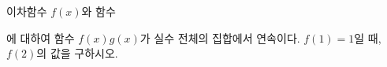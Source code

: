 이차함수 $f(x)$와 함수 \par\smallskip{}\par\smallskip\noindent 에 대하여 함수 $f(x)g(x)$가 실수 전체의 집합에서 연속이다. $f(1)=1$일 때, $f(2)$의 값을 구하시오.

